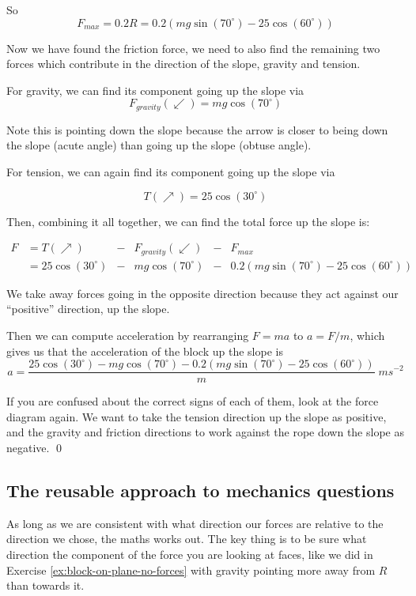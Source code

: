 \begin{solution}
So 
\[F_{max} = 0.2 R = 0.2  (mg \sin (70^\circ)  - 25 \cos(60^\circ) )\]

Now we have found the friction force, we need to also find the remaining two forces which contribute in the direction of the slope, 
gravity and tension.

For gravity, we can find its component going up the slope via 
\[F_{gravity}(\swarrow) = mg\cos(70^\circ)\]

Note this is pointing down the slope because the arrow is closer to being down the slope (acute angle) than going up the slope (obtuse angle).

For tension, we can again find its component going up the slope via 

\[T(\nearrow) = 25 \cos (30^\circ)\]

Then, combining it all together, we can find the total force up the slope is:

\begin{align*}
 F &= T(\nearrow) &-& F_{gravity}(\swarrow) &-& F_{max} \\
 &= 25 \cos (30^\circ) &-&  mg\cos(70^\circ) &-&  0.2  (mg \sin (70^\circ)  - 25 \cos(60^\circ))
 \end{align*}

 We take away forces going in the opposite direction because they act against our ``positive'' direction, up the slope.

Then we can compute acceleration by rearranging $F = ma$ to $a = F/m$, which gives us that the acceleration of 
the block up the slope is 
\[a = \frac{25 \cos (30^\circ) -  mg\cos(70^\circ) -  0.2  (mg \sin (70^\circ)  - 25 \cos(60^\circ))}{m} \; ms^{-2}\]

If you are confused about the correct signs of each of them, look at the force diagram again. We want to take the tension direction up the slope 
as positive, and the gravity and friction directions to work against the rope down the slope as negative.
\qed
\end{solution}

\subsection{The reusable approach to mechanics questions}
As long as we are consistent with what direction our forces are relative to the direction we chose, the maths works out. The key thing is to be sure what direction the component of the force you are looking at faces, like we did 
in Exercise \ref{ex:block-on-plane-no-forces} with gravity pointing more away from $R$ than towards it.

